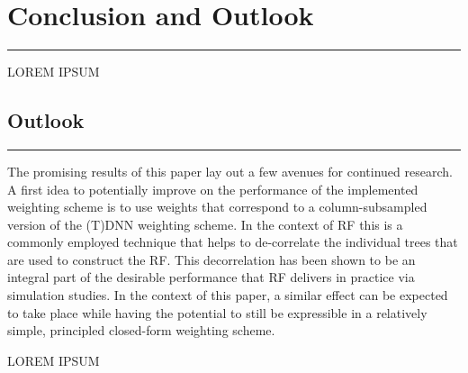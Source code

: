 \section{Conclusion and Outlook}\label{sec:conclusion}
\hrule
{\color{red} LOREM IPSUM}

\subsection{Outlook}
\hrule
The promising results of this paper lay out a few avenues for continued research.
A first idea to potentially improve on the performance of the implemented weighting scheme is to use weights that correspond to a column-subsampled version of the (T)DNN weighting scheme.
In the context of RF this is a commonly employed technique that helps to de-correlate the individual trees that are used to construct the RF.
This decorrelation has been shown to be an integral part of the desirable performance that RF delivers in practice via simulation studies.
In the context of this paper, a similar effect can be expected to take place while having the potential to still be expressible in a relatively simple, principled closed-form weighting scheme.

{\color{red} LOREM IPSUM}
